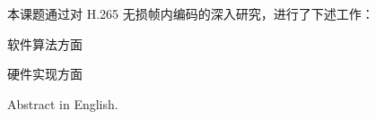 \begin{cabstract}



    本课题通过对 H.265 无损帧内编码的深入研究，进行了下述工作：

    软件算法方面

    硬件实现方面
\end{cabstract}


\begin{eabstract}
    Abstract in English.
\end{eabstract}

